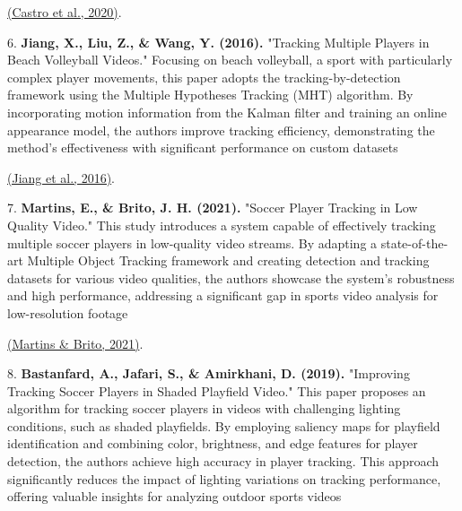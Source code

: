 \documentclass[12pt, letterpaper]{article}
\begin{document}
{\begin{spacing}{1.2}
\href{https://consensus.app/papers/hybrid-approach-tracking-individual-players-broadcast-castro/16e287d81de75e84a0372988c3772674/?utm_source=chatgpt}{(Castro et al., 2020)}.

6. \textbf{Jiang, X., Liu, Z., \& Wang, Y. (2016).} "Tracking Multiple Players in Beach Volleyball Videos." 
Focusing on beach volleyball, a sport with particularly complex player movements, this paper adopts the tracking-by-detection framework using the Multiple Hypotheses Tracking (MHT) algorithm. By incorporating motion information from the Kalman filter and training an online appearance model, the authors improve tracking efficiency, demonstrating the method's effectiveness with significant performance on custom datasets

\href{https://consensus.app/papers/tracking-multiple-players-beach-volleyball-videos-jiang/c3d1612f3ef75e5e8a6f444a0e67e092/?utm_source=chatgpt}{(Jiang et al., 2016)}.

7. \textbf{Martins, E., \& Brito, J. H. (2021).} "Soccer Player Tracking in Low Quality Video." 
This study introduces a system capable of effectively tracking multiple soccer players in low-quality video streams. By adapting a state-of-the-art Multiple Object Tracking framework and creating detection and tracking datasets for various video qualities, the authors showcase the system's robustness and high performance, addressing a significant gap in sports video analysis for low-resolution footage

\href{https://consensus.app/papers/soccer-player-tracking-quality-video-martins/52e9b286c14e5787acfbd18fc50042c4/?utm_source=chatgpt}{(Martins \& Brito, 2021)}.

8. \textbf{Bastanfard, A., Jafari, S., \& Amirkhani, D. (2019).} "Improving Tracking Soccer Players in Shaded Playfield Video." 
This paper proposes an algorithm for tracking soccer players in videos with challenging lighting conditions, such as shaded playfields. By employing saliency maps for playfield identification and combining color, brightness, and edge features for player detection, the authors achieve high accuracy in player tracking. This approach significantly reduces the impact of lighting variations on tracking performance, offering valuable insights for analyzing outdoor sports videos


\end{spacing}}
\end{document}
